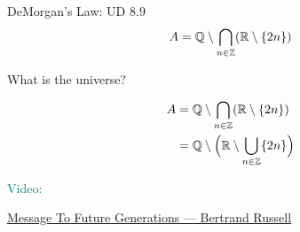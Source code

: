 \begin{frame}{}
  \begin{exampleblock}{DeMorgan's Law: UD $8.9$}
    \[
      A = \mathbb{Q} \setminus \bigcap_{n \in \mathbb{Z}} (\mathbb{R} \setminus \{2n\})
    \]
  \end{exampleblock}

  \pause
  \vspace{0.50cm}
  \centerline{ What is the  universe?}

  \pause
  \begin{align*}
     A &= \mathbb{Q} \setminus \bigcap_{n \in \mathbb{Z}} (\mathbb{R} \setminus \{2n\}) \\
     &= \mathbb{Q} \setminus \Big(\mathbb{R} \setminus \bigcup_{n \in \mathbb{Z}} \{2n\} \Big) \\
  \end{align*}
\end{frame}

\begin{frame}{}
  \centerline{\Large \textcolor{teal}{Video:}}
  \vspace{0.20cm}
  \centerline{\large \textcolor{teal}{\href{https://www.youtube.com/watch?v=HXuvEeecZtU}{Message To Future Generations --- Bertrand Russell}}}
\end{frame}
